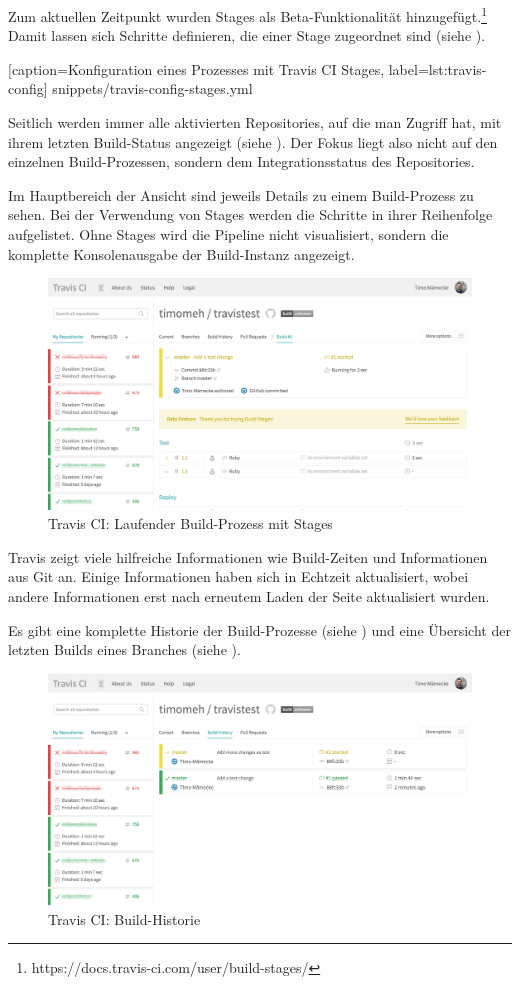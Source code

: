 Zum aktuellen Zeitpunkt wurden Stages als Beta-Funktionalität hinzugefügt.\footnote{https://docs.travis-ci.com/user/build-stages/} Damit lassen sich Schritte definieren, die einer Stage zugeordnet sind (siehe ).


  [caption={Konfiguration eines Prozesses mit Travis CI Stages},
  label={lst:travis-config}]
  {snippets/travis-config-stages.yml}

Seitlich werden immer alle aktivierten Repositories, auf die man Zugriff hat, mit ihrem letzten Build-Status angezeigt (siehe ). Der Fokus liegt also nicht auf den einzelnen Build-Prozessen, sondern dem Integrationsstatus des Repositories.

Im Hauptbereich der Ansicht sind jeweils Details zu einem Build-Prozess zu sehen. Bei der Verwendung von Stages werden die Schritte in ihrer Reihenfolge aufgelistet. Ohne Stages wird die Pipeline nicht visualisiert, sondern die komplette Konsolenausgabe der Build-Instanz angezeigt.

\begin{figure}[h]
  \caption{Travis CI: Laufender Build-Prozess mit Stages}
  \label{fig:travis-running-build}
  \includegraphics[width=.8\textwidth]{assets/travis-running-build}
\end{figure}

Travis zeigt viele hilfreiche Informationen wie Build-Zeiten und Informationen aus Git an. Einige Informationen haben sich in Echtzeit aktualisiert, wobei andere Informationen erst nach erneutem Laden der Seite aktualisiert wurden.

Es gibt eine komplette Historie der Build-Prozesse (siehe ) und eine Übersicht der letzten Builds eines Branches (siehe ).

\begin{figure}[h]
  \caption{Travis CI: Build-Historie}
  \label{fig:travis-history}
  \includegraphics[width=.8\textwidth]{assets/travis-history}
\end{figure}

